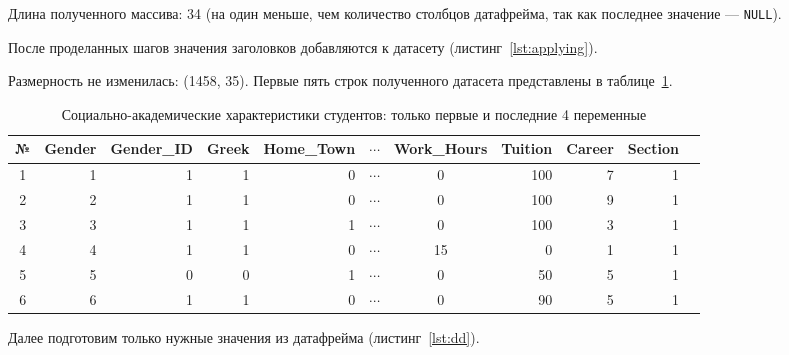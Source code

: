 

Длина полученного массива: 34 (на один меньше, чем количество столбцов датафрейма, так как последнее значение — \texttt{NULL}).

После проделанных шагов значения заголовков добавляются к датасету (листинг~\ref{lst:applying}).



Размерность не изменилась: (1458, 35). Первые пять строк полученного датасета представлены в таблице~\ref{tab:students_summary}.

\begin{table}[ht]
	\centering
	\caption{Социально-академические характеристики студентов: только первые и последние 4 переменные}
	\scriptsize
	\setlength{\tabcolsep}{6pt}
	\begin{tabular}{|c|r r r r r c r r r r|}
		\hline
		№ & Gender & Gender\_ID & Greek & Home\_Town & $\cdots$ & Work\_Hours & Tuition & Career & Section \\
		\hline
		1 & 1 & 1 & 1 & 0 & $\cdots$ & 0 & 100 & 7 & 1 \\
		2 & 2 & 1 & 1 & 0 & $\cdots$ & 0 & 100 & 9 & 1 \\
		3 & 3 & 1 & 1 & 1 & $\cdots$ & 0 & 100 & 3 & 1 \\
		4 & 4 & 1 & 1 & 0 & $\cdots$ &15 & 0 & 1 & 1 \\
		5 & 5 & 0 & 0 & 1 & $\cdots$ & 0 & 50 & 5 & 1 \\
		6 & 6 & 1 & 1 & 0 & $\cdots$ & 0 & 90 & 5 & 1 \\
		\hline
	\end{tabular}
	\label{tab:students_summary}
\end{table}

Далее подготовим только нужные значения из датафрейма (листинг~\ref{lst:dd}).



